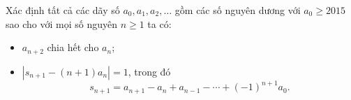\ifshowproblem
\begin{problem}\label{example:APMO-2015-P5}
    Xác định tất cả các dãy số \( a_0, a_1, a_2, \ldots \) gồm các số nguyên dương với \( a_0 \ge 2015 \)
    sao cho với mọi số nguyên \( n \ge 1 \) ta có:
    \begin{itemize}[topsep=0pt, partopsep=0pt, itemsep=0pt]
        \item \( a_{n+2} \) chia hết cho \( a_n \);
        \item \( \left| s_{n+1} - (n + 1)a_n \right| = 1 \), trong đó
        \[
            s_{n+1} = a_{n+1} - a_n + a_{n-1} - \cdots + (-1)^{n+1} a_0.
        \]
    \end{itemize}
\end{problem}
\fi

\footnotemark
{}
\fi